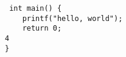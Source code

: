\documentclass{article} \usepackage{minted}
\begin{document}
 \begin{verbatim} int main() {
    printf("hello, world");
    return 0;
4
}
\end{verbatim} 
\end{document}

